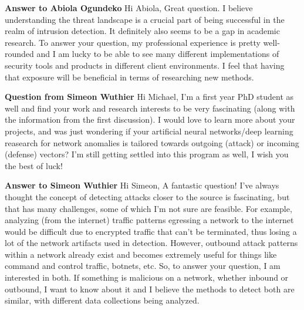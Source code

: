 \textbf{Answer to Abiola Ogundeko}
Hi Abiola, Great question. I believe understanding the threat landscape is a crucial part of being successful in the realm of intrusion detection. It definitely also seems to be a gap in academic research. To answer your question, my professional experience is pretty well-rounded and I am lucky to be able to see many different implementations of security tools and products in different client environments. I feel that having that exposure will be beneficial in terms of researching new methods.

\textbf{Question from Simeon Wuthier}
Hi Michael, I'm a first year PhD student as well and find your work and research interests to be very fascinating (along with the information from the first discussion). I would love to learn more about your projects, and was just wondering if your artificial neural networks/deep learning reasearch for network anomalies is tailored towards outgoing (attack) or incoming (defense) vectors? I'm still getting settled into this program as well, I wish you the best of luck!

\textbf{Answer to Simeon Wuthier}
Hi Simeon, A fantastic question! I've always thought the concept of detecting attacks closer to the source is fascinating, but that has many challenges, some of which I'm not sure are feasible. For example, analyzing (from the internet) traffic patterns egressing a network to the internet would be difficult due to encrypted traffic that can't be terminated, thus losing a lot of the network artifacts used in detection. However, outbound attack patterns within a network already exist and becomes extremely useful for things like command and control traffic, botnets, etc. So, to answer your question, I am interested in both. If something is malicious on a network, whether inbound or outbound, I want to know about it and I believe the methods to detect both are similar, with different data collections being analyzed.
